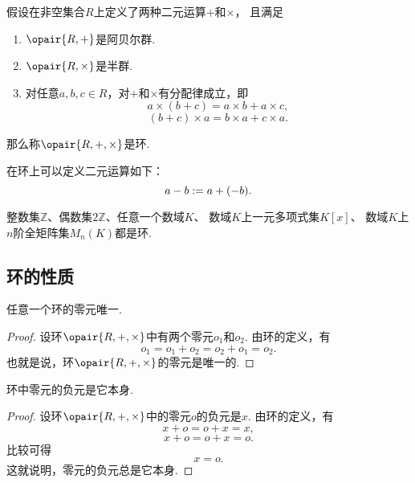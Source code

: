 \begin{theorem}
假设在非空集合\(R\)上定义了两种二元运算\(+\)和\(\times\)，
且满足\begin{enumerate}
	\item \(\opair{R,+}\)是阿贝尔群.

	\item \(\opair{R,\times}\)是半群.

	\item 对任意\(a,b,c \in R\)，对\(+\)和\(\times\)有分配律成立，即\begin{equation*}
		a \times (b + c) = a \times b + a \times c,
	\end{equation*}\begin{equation*}
		(b + c) \times a = b \times a + c \times a.
	\end{equation*}
\end{enumerate}
那么称\(\opair{R,+,\times}\)是环.
\end{theorem}

在环上可以定义二元运算如下：\begin{equation*}
	a - b := a + (-b).
\end{equation*}

\begin{example}
整数集\(\mathbb{Z}\)、偶数集\(2\mathbb{Z}\)、任意一个数域\(K\)、
数域\(K\)上一元多项式集\(K[x]\)、
数域\(K\)上\(n\)阶全矩阵集\(M_n(K)\)都是环.
\end{example}

\subsection{环的性质}
\begin{property}
任意一个环的零元唯一.
\begin{proof}
设环\(\opair{R,+,\times}\)中有两个零元\(o_1\)和\(o_2\).
由环的定义，有\begin{equation*}
	o_1 = o_1 + o_2 = o_2 + o_1 = o_2.
\end{equation*}
也就是说，环\(\opair{R,+,\times}\)的零元是唯一的.
\end{proof}
\end{property}

\begin{property}
环中零元的负元是它本身.
\begin{proof}
设环\(\opair{R,+,\times}\)中的零元\(o\)的负元是\(x\).
由环的定义，有\begin{equation*}
	x + o = o + x = x,
\end{equation*}\begin{equation*}
	x + o = o + x = o.
\end{equation*}比较可得\begin{equation*}
	x = o.
\end{equation*}
这就说明，零元的负元总是它本身.
\end{proof}
\end{property}

